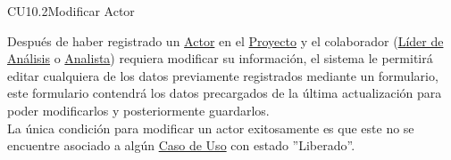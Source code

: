 	\begin{UseCase}{CU10.2}{Modificar Actor}{
			
		Después de haber registrado un \hyperlink{actorEntidad}{Actor} en el \hyperlink{proyectoEntidad}{Proyecto} y el colaborador (\hyperlink{jefe}{Líder de Análisis} o \hyperlink{analista}{Analista}) requiera modificar su información, el sistema le permitirá editar cualquiera de los datos previamente registrados mediante un formulario, este formulario contendrá los datos precargados de la última actualización para poder modificarlos y posteriormente guardarlos.\\
		
		La única condición para modificar un actor exitosamente es que este no se encuentre asociado a algún \hyperlink{casoUso}{Caso de Uso} con estado ”Liberado”.
	
}
\end{UseCase}
